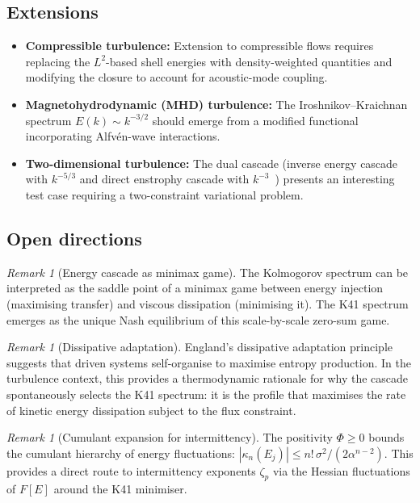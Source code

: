 \documentclass[12pt,a4paper]{article}
\theoremstyle{definition}
\theoremstyle{plain}
\theoremstyle{remark}
\newtheorem{remark}[definition]{Remark}
\begin{document}
\subsection{Extensions}

\begin{itemize}
  \item \textbf{Compressible turbulence:}
    Extension to compressible flows requires replacing the $L^2$-based
    shell energies with density-weighted quantities and modifying the
    closure to account for acoustic-mode coupling.
  \item \textbf{Magnetohydrodynamic (MHD) turbulence:}
    The Iroshnikov--Kraichnan spectrum $E(k) \sim k^{-3/2}$ should emerge
    from a modified functional incorporating Alfv\'en-wave interactions.
  \item \textbf{Two-dimensional turbulence:}
    The dual cascade (inverse energy cascade with $k^{-5/3}$ and direct
    enstrophy cascade with $k^{-3}$~\cite{Kraichnan67}) presents an
    interesting test case requiring a two-constraint variational problem.
\end{itemize}

\subsection{Open directions}

\begin{remark}[Energy cascade as minimax game]
The Kolmogorov spectrum can be interpreted as the saddle point of a minimax game between energy injection (maximising transfer) and viscous dissipation (minimising it). The K41 spectrum emerges as the unique Nash equilibrium of this scale-by-scale zero-sum game.
\end{remark}

\begin{remark}[Dissipative adaptation]
England's dissipative adaptation principle suggests that driven systems self-organise to maximise entropy production. In the turbulence context, this provides a thermodynamic rationale for why the cascade spontaneously selects the K41 spectrum: it is the profile that maximises the rate of kinetic energy dissipation subject to the flux constraint.
\end{remark}

\begin{remark}[Cumulant expansion for intermittency]
The positivity $\Phi \geq 0$ bounds the cumulant hierarchy of energy fluctuations: $|\kappa_n(E_j)| \leq n! \, \sigma^2 / (2\alpha^{n-2})$. This provides a direct route to intermittency exponents $\zeta_p$ via the Hessian fluctuations of $F[E]$ around the K41 minimiser.
\end{remark}
\end{document}
